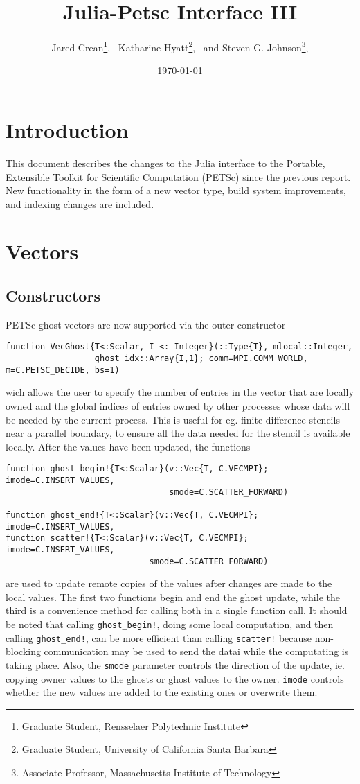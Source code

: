 \documentclass{article}
\title{Julia-Petsc Interface III}
\author{
  Jared Crean\thanks{Graduate Student, Rensselaer Polytechnic Institute}, \
  Katharine Hyatt\thanks{Graduate Student, University of California Santa Barbara}, \ and
  Steven G. Johnson\thanks{Associate Professor, Massachusetts Institute of Technology},
}
\date{\today}
\newcommand{\ttt}{\texttt}
\begin{document}
\maketitle

\section{Introduction} \label{sec:intro}
This document describes the changes to the Julia interface to the Portable, Extensible Toolkit for Scientific Computation (PETSc) since the previous report.
New functionality in the form of a new vector type, build system improvements, and indexing changes are included.


\section{Vectors}
\subsection{Constructors}
PETSc ghost vectors are now supported via the outer constructor

\begin{verbatim}
function VecGhost{T<:Scalar, I <: Integer}(::Type{T}, mlocal::Integer, 
                  ghost_idx::Array{I,1}; comm=MPI.COMM_WORLD, m=C.PETSC_DECIDE, bs=1)
\end{verbatim}
\noindent wich allows the user to specify the number of entries in the vector 
that are locally owned and the global indices of entries owned by other 
processes whose data will be needed by the current process.  This is useful
for eg. finite difference stencils near a parallel boundary, to ensure all the 
data needed for the stencil is available locally. After the values have been
updated, the functions

\begin{verbatim}
function ghost_begin!{T<:Scalar}(v::Vec{T, C.VECMPI}; imode=C.INSERT_VALUES,
                                 smode=C.SCATTER_FORWARD)

function ghost_end!{T<:Scalar}(v::Vec{T, C.VECMPI}; imode=C.INSERT_VALUES,
function scatter!{T<:Scalar}(v::Vec{T, C.VECMPI}; imode=C.INSERT_VALUES, 
                             smode=C.SCATTER_FORWARD)
\end{verbatim}

\noindent are used to update remote copies of the values after changes are made
to the local values.  The first two functions begin and end the ghost update, 
while the third is a convenience method for calling both in a single function 
call.  It should be noted that calling \texttt{ghost\_begin!}, doing some 
local computation, and then calling \texttt{ghost\_end!}, can be more efficient
than calling \ttt{scatter!} because non-blocking communication may be used to
send the datai while the computating is taking place.  
Also, the \texttt{smode} parameter controls the direction of
the update, ie. copying owner values to the ghosts or ghost values to the owner.
\texttt{imode} controls whether the new values are added to the existing 
ones or overwrite them.
\end{document}

